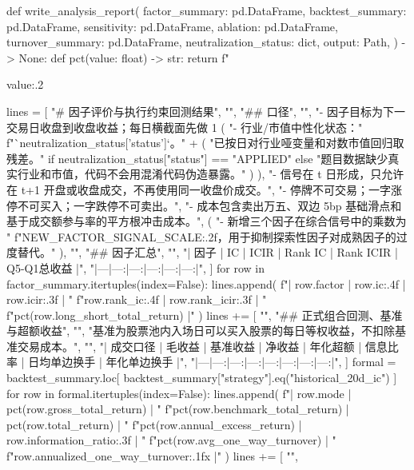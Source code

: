 \documentclass[UTF8,a4paper,fontset=fandol]{ctexart}
\begin{document}
\begin{ProjectCode}
def write_analysis_report(
    factor_summary: pd.DataFrame,
    backtest_summary: pd.DataFrame,
    sensitivity: pd.DataFrame,
    ablation: pd.DataFrame,
    turnover_summary: pd.DataFrame,
    neutralization_status: dict,
    output: Path,
) -> None:
    def pct(value: float) -> str:
        return f"{value:.2%

    lines = [
        "# 因子评价与执行约束回测结果",
        "",
        "## 口径",
        "",
        "- 因子目标为下一交易日收盘到收盘收益；每日横截面先做 1%
        (
            "- 行业/市值中性化状态："
            f"`{neutralization_status['status']}`。"
            + (
                "已按日对行业哑变量和对数市值回归取残差。"
                if neutralization_status["status"] == "APPLIED"
                else "题目数据缺少真实行业和市值，代码不会用混淆代码伪造暴露。"
            )
        ),
        "- 信号在 t 日形成，只允许在 t+1 开盘或收盘成交，不再使用同一收盘价成交。",
        "- 停牌不可交易；一字涨停不可买入；一字跌停不可卖出。",
        "- 成本包含卖出万五、双边 5bp 基础滑点和基于成交额参与率的平方根冲击成本。",
        (
            "- 新增三个因子在综合信号中的乘数为 "
            f"{NEW_FACTOR_SIGNAL_SCALE:.2f}，用于抑制探索性因子对成熟因子的过度替代。"
        ),
        "",
        "## 因子汇总",
        "",
        "| 因子 | IC | ICIR | Rank IC | Rank ICIR | Q5-Q1总收益 |",
        "|---|---:|---:|---:|---:|---:|",
    ]
    for row in factor_summary.itertuples(index=False):
        lines.append(
            f"| {row.factor} | {row.ic:.4f} | {row.icir:.3f} | "
            f"{row.rank_ic:.4f} | {row.rank_icir:.3f} | "
            f"{pct(row.long_short_total_return)} |"
        )
    lines += [
        "",
        "## 正式组合回测、基准与超额收益",
        "",
        "基准为股票池内入场日可以买入股票的每日等权收益，不扣除基准交易成本。",
        "",
        "| 成交口径 | 毛收益 | 基准收益 | 净收益 | 年化超额 | 信息比率 | 日均单边换手 | 年化单边换手 |",
        "|---|---:|---:|---:|---:|---:|---:|---:|",
    ]
    formal = backtest_summary.loc[
        backtest_summary["strategy"].eq("historical_20d_ic")
    ]
    for row in formal.itertuples(index=False):
        lines.append(
            f"| {row.mode} | {pct(row.gross_total_return)} | "
            f"{pct(row.benchmark_total_return)} | {pct(row.total_return)} | "
            f"{pct(row.annual_excess_return)} | {row.information_ratio:.3f} | "
            f"{pct(row.avg_one_way_turnover)} | "
            f"{row.annualized_one_way_turnover:.1f}x |"
        )
    lines += [
        "",
}
\end{ProjectCode}
\end{document}
